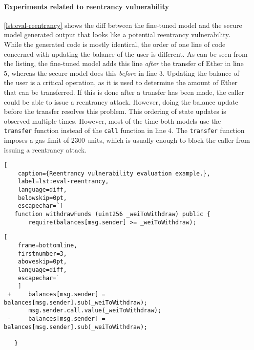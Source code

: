 \paragraph{Experiments related to reentrancy vulnerability}
\cref{lst:eval-reentrancy} shows the diff between the fine-tuned model and the secure model generated output that looks like a potential reentrancy vulnerability. While the generated code is mostly identical, the order of one line of code concerned with updating the balance of the user is different. As can be seen from the listing, the fine-tuned model adds this line \textit{after} the transfer of Ether in line 5, whereas the secure model does this \textit{before} in line 3. Updating the balance of the user is a critical operation, as it is used to determine the amount of Ether that can be transferred. If this is done after a transfer has been made, the caller could be able to issue a reentrancy attack. However, doing the balance update before the transfer resolves this problem. This ordering of state updates is observed multiple times. However, most of the time both models use the \lstinline[language=Solidity]!transfer! function instead of the \lstinline[language=Solidity]!call! function in line 4. The \lstinline[language=Solidity]!transfer! function imposes a gas limit of 2300 units, which is usually enough to block the caller from issuing a reentrancy attack.

\begin{lstlisting}[
    caption={Reentrancy vulnerability evaluation example.},
    label=lst:eval-reentrancy,
    language=diff,
    belowskip=0pt,
    escapechar=`]
   function withdrawFunds (uint256 _weiToWithdraw) public {
       require(balances[msg.sender] >= _weiToWithdraw);
\end{lstlisting}
\begin{lstlisting}[
    frame=bottomline,
    firstnumber=3,
    aboveskip=0pt,
    language=diff,
    escapechar=`
    ]
 +     balances[msg.sender] = balances[msg.sender].sub(_weiToWithdraw);
       msg.sender.call.value(_weiToWithdraw);
 -     balances[msg.sender] = balances[msg.sender].sub(_weiToWithdraw);

   }   
\end{lstlisting}

